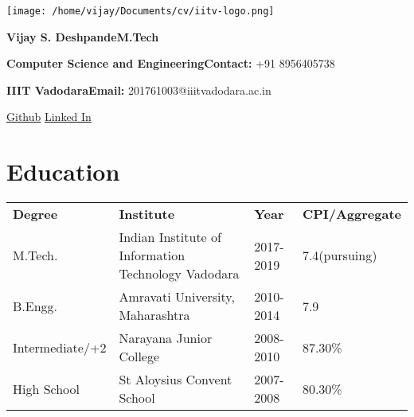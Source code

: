 \documentclass{article}
\begin{document}
\begin{minipage}{.1\textwidth}
	
\texttt{[image: /home/vijay/Documents/cv/iitv-logo.png]}
\end{minipage}%
\begin{minipage}{1.5\textwidth}
\begin{large}
	
	
\hspace*{2cm}\textbf{Vijay S. Deshpande}\hspace*{4cm}\textbf{M.Tech} \vspace*{2mm}

\hspace*{2cm}\textbf{Computer Science and Engineering}\vspace*{2mm}\hspace*{0.8cm}\textbf{Contact:} +91 8956405738

\hspace*{2cm}\textbf{IIIT Vadodara}\hspace*{5.1cm}\textbf{Email:} 201761003@iiitvadodara.ac.in\vspace*{2mm}

\hspace*{2cm}\href{https://github.com/vjayd}{Github} 
\hspace*{6.7cm}\href{https://www.linkedin.com/in/deshpandevijay/}{Linked In}\vspace*{2mm}

%
%
\end{large}    
\end{minipage}

\section{Education}
\begin{tabular}{llll}
\textbf{Degree}&\textbf{Institute}&\textbf{Year}&\textbf{CPI/Aggregate}\vspace*{1mm} \\
M.Tech.& Indian Institute of Information Technology Vadodara & 2017-2019 & 7.4(pursuing) \\
B.Engg.& Amravati University, Maharashtra & 2010-2014 & 7.9\\
Intermediate/+2 & Narayana Junior College & 2008-2010 & 87.30\%\\
High School & St Aloysius Convent School & 2007-2008 & 80.30\%\\
\end{tabular}
\end{document}
